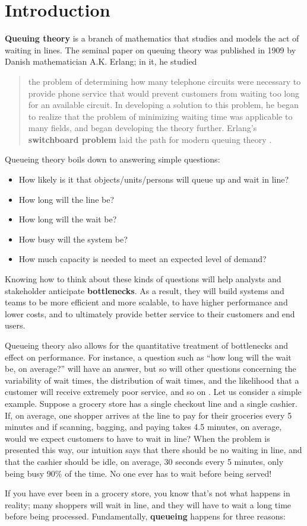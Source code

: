 \section{Introduction}\textbf{Queuing theory} is a branch of mathematics that studies and models the act of waiting in lines.  The seminal paper on queuing theory \cite{QS_Erlang} was published in 1909 by Danish mathematician A.K. Erlang; in it, he studied \begin{quote} the problem of determining how many telephone circuits were necessary to provide phone service that would prevent customers from waiting too long for an available circuit. In developing a solution to this problem, he began to realize that the problem of minimizing waiting time was applicable to many fields, and began developing the theory further. Erlang's \textbf{switchboard problem} laid the path for modern queuing theory \cite{QS_Berry}.\end{quote}
Queueing theory boils down to answering simple questions:
\begin{itemize}[noitemsep]
\item How likely is it that objects/units/persons will queue up and wait in line?
\item How long will the line be?
\item How long will the wait be?
\item How busy will the system  be?
\item How much capacity is needed to meet an expected level of demand?
\end{itemize}
Knowing how to think about these kinds of questions will help analysts and stakeholder anticipate \textbf{bottlenecks}. As a result, they will build systems and teams to be more efficient and more scalable, to have higher performance and lower costs, and to ultimately provide better service to their customers and end users. \par Queueing theory also allows for the quantitative treatment of bottlenecks and effect on performance. For instance, a question such as ``how long will the wait be, on average?'' will have an answer, but so will other questions concerning the variability of wait times, the distribution of wait times, and the likelihood that a customer will receive extremely poor service, and so on \cite{QS_K1}.
\newl 
Let us consider a simple example. Suppose a grocery store has a single checkout line and a single cashier. If, on average, one shopper arrives at the line to pay for their groceries every 5 minutes and if scanning, bagging, and paying takes 4.5 minutes, on average, would we expect customers to have to wait in line? When the problem is presented this way, our intuition says that there should be no waiting in line, and that the cashier should be idle, on average, 30 seconds every 5 minutes, only being busy 90\% of the time. No one ever has to wait before being served! \par If you have ever been in a grocery store, you know that's not what happens in reality; many shoppers will wait in line, and they will have to wait a long time before being processed. Fundamentally, \textbf{queueing} happens for three reasons:
